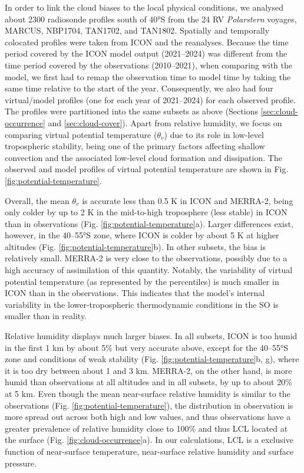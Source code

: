\documentclass[draft]{agujournal2019}
\begin{document}
In order to link the cloud biases to the local physical conditions, we analysed
about 2300 radiosonde profiles south of 40°S from the 24 RV \emph{Polarstern}
voyages, MARCUS, NBP1704, TAN1702, and TAN1802. Spatially and temporally
colocated profiles were taken from ICON and the reanalyses.  Because the time
period covered by the ICON model output (2021--2024) was different from the
time period covered by the observations (2010--2021), when comparing with the
model, we first had to remap the observation time to model time by taking the
same time relative to the start of the year. Consequently, we also had four
virtual/model profiles (one for each year of 2021--2024) for each observed
profile.  The profiles were partitioned into the same subsets as above
(Sections \ref{sec:cloud-occurrence} and \ref{sec:cloud-cover}).  Apart from
relative humidity, we focus on comparing virtual potential temperature
($\theta_v$) due to its role in low-level tropospheric stability, being one of
the primary factors affecting shallow convection and the associated low-level
cloud formation and dissipation. The observed and model profiles of virtual
potential temperature are shown in Fig. \ref{fig:potential-temperature}.

Overall, the mean $\theta_v$ is accurate less than 0.5 K in ICON and MERRA-2,
being only colder by up to 2 K in the mid-to-high troposphere (less stable) in
ICON than in observations (Fig. \ref{fig:potential-temperature}a).  Larger
differences exist, however, in the 40--55°S zone, where ICON is colder by about
5 K at higher altitudes (Fig.  \ref{fig:potential-temperature}b). In other
subsets, the bias is relatively small. MERRA-2 is very close to the
observations, possibly due to a high accuracy of assimilation of this quantity.
Notably, the variability of virtual potential temperature (as represented by
the percentiles) is much smaller in ICON than in the observations. This
indicates that the model's internal variability in the lower-tropospheric
thermodynamic conditions in the SO is smaller than in reality.

Relative humidity displays much larger biases. In all subsets, ICON is too
humid in the first 1 km by about 5\% but very accurate above, except for the
40--55°S zone and conditions of weak stability (Fig.
\ref{fig:potential-temperature}b, g),  where it is too dry between about 1 and
3 km. MERRA-2, on the other hand, is more humid than observations at all
altitudes and in all subsets, by up to about 20\% at 5 km. Even though the mean
near-surface relative humidity is similar to the observations (Fig.
\ref{fig:potential-temperature}), the distribution in observation is more spread
out across both high and low values, and thus observations have a greater
prevalence of relative humidity close to 100\% and thus LCL located at the
surface (Fig. \ref{fig:cloud-occurrence}a). In our calculations, LCL is a exclusive
function of near-surface temperature, near-surface relative humidity and
surface pressure.
\end{document}
